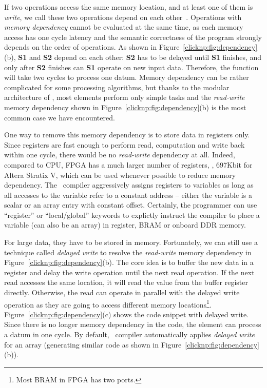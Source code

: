 If two operations access the same memory location, and at least one of them
is \textit{write}, we call these two operations depend on each other~\cite{dependence}. 
Operations with \textit{memory dependency} cannot be evaluated at the same time,
as each memory access has one cycle latency and the semantic correctness of the program strongly depends on the order
of operations.
%
As shown in Figure~\ref{clicknp:fig:dependency}(b), \textbf{S1} and \textbf{S2}
depend on each other: \textbf{S2} has to be delayed until \textbf{S1} finishes, 
and only after \textbf{S2} finishes can \textbf{S1} operate on new input data.
Therefore, the function will take two cycles to process one datum.
%
Memory dependency can be rather complicated for some processing algorithms,
but thanks to the modular architecture of \name, most elements perform 
only simple tasks and the \textit{read-write} memory dependency shown in 
Figure~\ref{clicknp:fig:dependency}(b) is the most common case we have encountered.

One way to remove this memory dependency is to store data in registers only. 
%
Since registers are fast enough to perform read, computation and write back within one cycle,
there would be no \textit{read-write} dependency at all. 
Indeed, compared to CPU, FPGA has a much larger number of 
registers, \ie, 697Kbit for Altera Stratix V, which can be used
whenever possible to reduce memory dependency.
The \name\ compiler aggressively assigns registers to variables as long as
all accesses to the variable refer to a constant address -- either the variable is a scalar or an array entry with constant offset.
%
Certainly, the programmer can use ``register'' or ``local/global'' keywords to explictly instruct the compiler to place a variable (can also be an array)
in register, BRAM or onboard DDR memory.

For large data, they have to be stored in memory. 
%
Fortunately, we can still use a technique called \textit{delayed write} to
resolve the \textit{read-write} memory dependency in Figure~\ref{clicknp:fig:dependency}(b).
The core idea is to buffer the new data in a register and delay the write
operation until the next read operation. 
If the next read accesses the same location, it will read the value from
the buffer register directly. Otherwise, the read can operate in parallel 
with the delayed write operation as they are going to access different
memory locations\footnote{Most BRAM in FPGA has two ports.}.
Figure~\ref{clicknp:fig:dependency}(c) shows the code snippet with delayed write.
Since there is no longer memory dependency in the code, the element can 
process a datum in one cycle.
%
By default, \name\ compiler automatically applies \textit{delayed write} 
for an array (generating similar code as shown in Figure~\ref{clicknp:fig:dependency}(b)).
%


